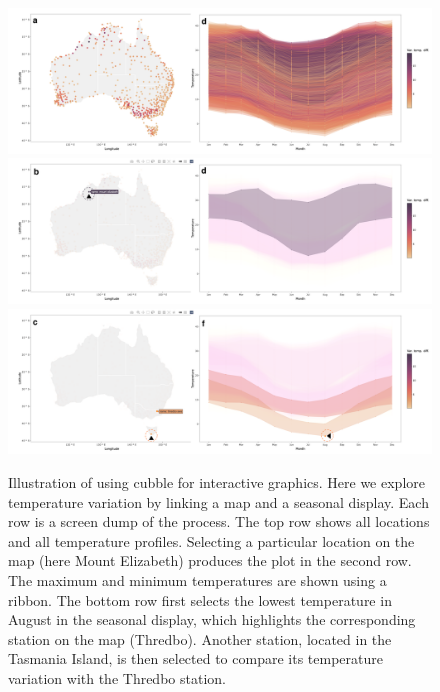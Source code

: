 \documentclass[
  shortnames]{jss}
\begin{document}
\begin{CodeChunk}
\begin{figure}

{\centering \includegraphics[width=1\linewidth,height=0.23\textheight]{figures/linking} \includegraphics[width=1\linewidth,height=0.23\textheight]{figures/linking-north} \includegraphics[width=1\linewidth,height=0.23\textheight]{figures/linking-lower} 

}

\caption[Illustration of using cubble for interactive graphics]{Illustration of using cubble for interactive graphics. Here we explore temperature variation by linking a map and a seasonal display. Each row is a screen dump of the process. The top row shows all locations and all temperature profiles. Selecting a particular location on the map (here Mount Elizabeth) produces the plot in the second row. The maximum and minimum temperatures are shown using a ribbon. The bottom row first selects the lowest temperature in August in the seasonal display, which highlights the corresponding station on the map (Thredbo). Another  station, located in the Tasmania Island, is then selected to compare its temperature variation with the Thredbo station.}\label{fig:interactive-linking}
\end{figure}
\end{CodeChunk}
\end{document}
